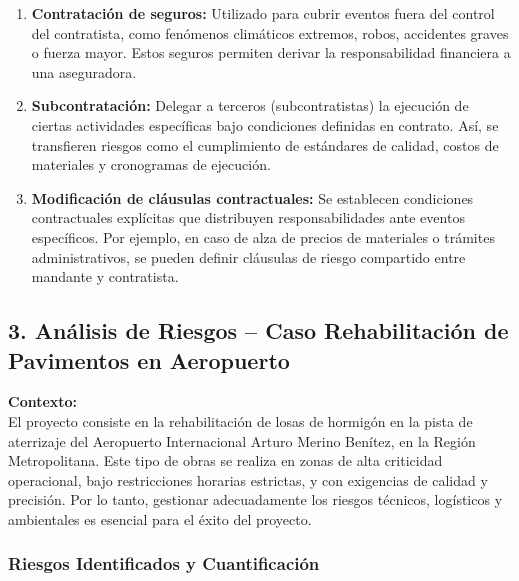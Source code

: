 \begin{enumerate}
    \item \textbf{Contratación de seguros:} 
    Utilizado para cubrir eventos fuera del control del contratista, como fenómenos climáticos extremos, robos, accidentes graves o fuerza mayor. Estos seguros permiten derivar la responsabilidad financiera a una aseguradora.

    \item \textbf{Subcontratación:}
    Delegar a terceros (subcontratistas) la ejecución de ciertas actividades específicas bajo condiciones definidas en contrato. Así, se transfieren riesgos como el cumplimiento de estándares de calidad, costos de materiales y cronogramas de ejecución.

    \item \textbf{Modificación de cláusulas contractuales:}
    Se establecen condiciones contractuales explícitas que distribuyen responsabilidades ante eventos específicos. Por ejemplo, en caso de alza de precios de materiales o trámites administrativos, se pueden definir cláusulas de riesgo compartido entre mandante y contratista.
\end{enumerate}

\vspace{0.3cm}

\subsection*{3. Análisis de Riesgos – Caso Rehabilitación de Pavimentos en Aeropuerto}

\textbf{Contexto:} \\
El proyecto consiste en la rehabilitación de losas de hormigón en la pista de aterrizaje del Aeropuerto Internacional Arturo Merino Benítez, en la Región Metropolitana. Este tipo de obras se realiza en zonas de alta criticidad operacional, bajo restricciones horarias estrictas, y con exigencias de calidad y precisión. Por lo tanto, gestionar adecuadamente los riesgos técnicos, logísticos y ambientales es esencial para el éxito del proyecto.

\vspace{0.3cm}

\subsubsection*{Riesgos Identificados y Cuantificación}


